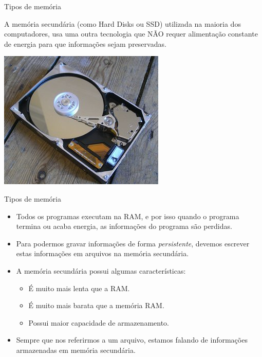 \documentclass[handout]{beamer}
\begin{document}
\begin{frame}{Tipos de memória}

    A memória secundária (como Hard Disks ou SSD) utilizada na maioria dos
    computadores, usa uma outra tecnologia que NÃO requer alimentação constante
    de energia para que informações sejam preservadas.

    \begin{center}
        \includegraphics[scale=0.6]{hard_drive}
    \end{center}

\end{frame}

\begin{frame}{Tipos de memória}

    \begin{itemize}
        \item Todos os  programas executam na RAM, e por isso quando o programa termina
        ou acaba energia, as informações do programa são perdidas.
        \pause
        \item Para podermos gravar informações de forma {\it persistente}, devemos escrever
        estas informações em arquivos na memória secundária.
        \pause
        \item A memória secundária possui algumas características:
        \begin{itemize}
            \item É muito mais lenta que a RAM.
            \item É muito mais barata que a memória RAM.
            \item Possui maior capacidade de armazenamento.
        \end{itemize}
        \pause
        \item Sempre que nos referirmos a um arquivo, estamos falando de informações
        armazenadas em memória secundária.
    \end{itemize}

\end{frame}
\end{document}
